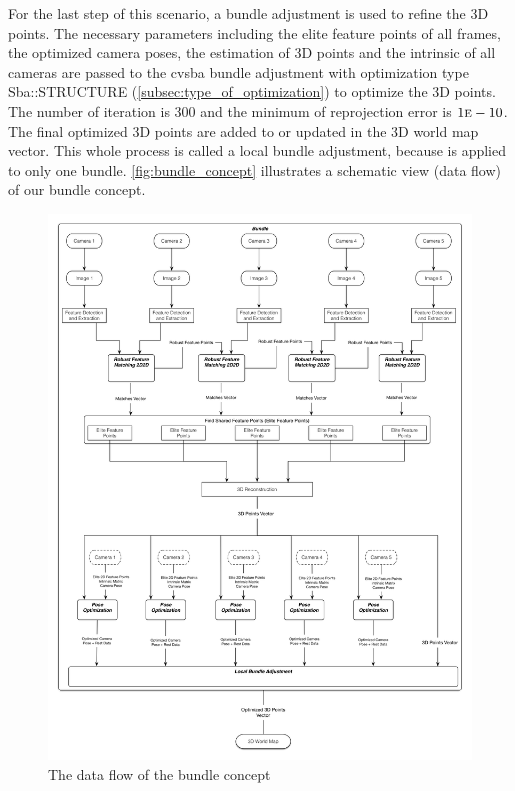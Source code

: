 For the last step of this scenario, a bundle adjustment is used to refine the 3D points. The necessary parameters including the elite feature points of all frames, the optimized camera poses, the estimation of 3D points and the intrinsic of all cameras are passed to the cvsba bundle adjustment with optimization type Sba::STRUCTURE (\autoref{subsec:type_of_optimization}) to optimize the 3D points. The number of iteration is 300 and the minimum of reprojection error is $1\mbox{\textsc{e}}-10$. The final optimized 3D points are added to or updated in the 3D world map vector. This whole process is called a local bundle adjustment, because is applied to only one bundle. \autoref{fig:bundle_concept} illustrates a schematic view (data flow) of our bundle concept.

\begin{figure}[H]
  \centering
  \includegraphics[width=\textwidth, height=\textheight, keepaspectratio]{figures/bundle_concept}
  \caption{The data flow of the bundle concept}\label{fig:bundle_concept}
\end{figure}

